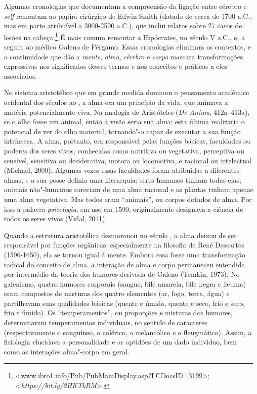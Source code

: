 Algumas cronologias que documentam a compreensão da ligação entre
cérebro e \emph{self} remontam ao papiro cirúrgico de Edwin Smith (datado de
cerca de 1700 a.C., mas em parte atribuível a 3000-2500 a.C.), que
inclui relatos sobre 27 casos de lesões na
cabeça.\footnote[6]{\textless{}www.ibro1.info/Pub/PubMainDisplay.asp?LCDocsID=3199\textgreater{};\\\textless{}\emph{https://bit.ly/2HKTkRM}\textgreater{}.} É mais comum remontar a Hipócrates, no século
V a.C., e, a seguir, ao médico Galeno de Pérgamo. Essas cronologias
eliminam os contextos, e a continuidade que dão a \emph{mente},
\emph{alma}, \emph{cérebro} e \emph{corpo} mascara transformações
expressivas nos significados desses termos e nos conceitos e práticas a
eles associados. 

No sistema aristotélico que em grande medida dominou o pensamento
acadêmico ocidental dos séculos  ao , a alma era um princípio da
vida, que animava a matéria potencialmente viva. Na analogia de
Aristóteles (\emph{De Anima}, 412a--413a), se o olho fosse um animal,
então a visão seria sua alma: esta última realizaria o potencial de ver
do olho material, tornando"-o capaz de executar a sua função intrínseca.
A alma, portanto, era responsável pelas funções básicas, faculdades ou
poderes dos seres vivos, conhecidas como nutritiva ou vegetativa,
perceptiva ou sensível, sensitiva ou desiderativa, motora ou locomotiva,
e racional ou intelectual (Michael, 2000). Algumas vezes essas
faculdades foram atribuídas a diferentes almas, e a sua posse definia
uma hierarquia: seres humanos tinham todas elas, animais não"-humanos
careciam de uma alma racional e as plantas tinham apenas uma alma
vegetativa. Mas todos eram ``animais'', ou corpos dotados de alma. Por
isso a palavra \emph{psicologia}, em uso em 1590, originalmente
designava a ciência de todos os seres vivos (Vidal, 2011).

Quando a estrutura aristotélica desmoronou no século , a alma deixou
de ser responsável por funções orgânicas; especialmente na filosofia de
René Descartes (1596-1650), ela se tornou igual à mente. Embora essa
fosse uma transformação radical do conceito de alma, a interação de alma
e corpo permaneceu entendida por intermédio da teoria dos humores
derivada de Galeno (Temkin, 1973). No galenismo, quatro humores
corporais (sangue, bile amarela, bile negra e fleuma) eram compostos de
misturas dos quatro elementos (ar, fogo, terra, água) e partilhavam suas
qualidades básicas (quente e úmido, quente e seco, frio e seco, frio e
úmido). Os ``temperamentos'', ou proporções e misturas dos humores,
determinavam temperamentos individuais, no sentido de caracteres
(respectivamente o sanguíneo, o colérico, o melancólico e o
fleugmático). Assim, a fisiologia elucidava a personalidade e as
aptidões de um dado individuo, bem como as interações alma"-corpo em
geral.

